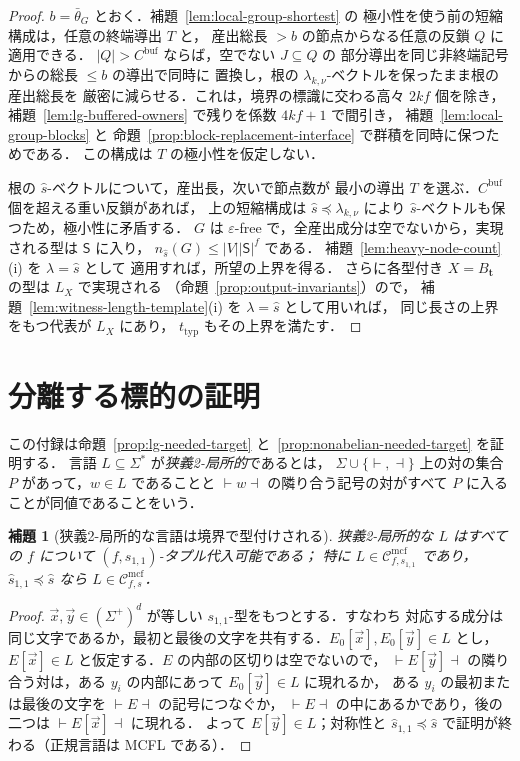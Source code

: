 \documentclass[11pt,a4paper]{ltjsarticle}
\numberwithin{equation}{section}
\theoremstyle{plain}
\newtheorem{lemma}[theorem]{補題}
\theoremstyle{definition}
\theoremstyle{remark}
\newcommand{\Cmcf}[2]{\mathcal{C}^{\mathrm{mcf}}_{#1,#2}}
\newcommand{\tuple}[1]{\vec{#1}}
\newcommand{\eps}{\varepsilon}
\theoremstyle{plain}
\begin{document}
\begin{proof}
$b=\bar\theta_G$ とおく．補題~\ref{lem:local-group-shortest} の
極小性を使う前の短縮構成は，任意の終端導出 $T$ と，
産出総長 $>b$ の節点からなる任意の反鎖 $Q$ に適用できる．
$|Q|>C^{\mathrm{buf}}$ ならば，空でない $J\subseteq Q$ の
部分導出を同じ非終端記号からの総長 $\le b$ の導出で同時に
置換し，根の $\lambda_{k,\nu}$-ベクトルを保ったまま根の産出総長を
厳密に減らせる．これは，境界の標識に交わる高々 $2kf$ 個を除き，
補題~\ref{lem:lg-buffered-owners} で残りを係数 $4kf+1$ で間引き，
補題~\ref{lem:local-group-blocks} と
命題~\ref{prop:block-replacement-interface} で群積を同時に保つためである．
この構成は $T$ の極小性を仮定しない．

根の $\widehat s$-ベクトルについて，産出長，次いで節点数が
最小の導出 $T$ を選ぶ．$C^{\mathrm{buf}}$ 個を超える重い反鎖があれば，
上の短縮構成は $\widehat s\preceq\lambda_{k,\nu}$ により
$\widehat s$-ベクトルも保つため，極小性に矛盾する．
$G$ は $\eps$-free で，全産出成分は空でないから，実現される型は
$\mathsf S$ に入り，
$n_{\widehat s}(G)\le|V||\mathsf S|^f$ である．
補題~\ref{lem:heavy-node-count}(i) を $\lambda=\widehat s$ として
適用すれば，所望の上界を得る．
さらに各型付き $X=B_{\mathbf t}$ の型は $L_X$ で実現される
（命題~\ref{prop:output-invariants}）ので，
補題~\ref{lem:witness-length-template}(i) を
$\lambda=\widehat s$ として用いれば，
同じ長さの上界をもつ代表が $L_X$ にあり，
$t_{\mathrm{typ}}$ もその上界を満たす．
\end{proof}

\section{分離する標的の証明}
\label{app:separating-targets}

この付録は命題~\ref{prop:lg-needed-target} と~\ref{prop:nonabelian-needed-target} を証明する．
言語 $L\subseteq\Sigma^*$ が\emph{狭義2-局所的}であるとは，
$\Sigma\cup\{\vdash,\dashv\}$ 上の対の集合 $P$ があって，$w\in L$ であることと
$\vdash w\dashv$ の隣り合う記号の対がすべて $P$ に入ることが同値であることをいう．

\begin{lemma}[狭義2-局所的な言語は境界で型付けされる]
\label{lem:sl2-boundary-control}
狭義2-局所的な $L$ はすべての $f$ について $(f,s_{1,1})$-タプル代入可能である；
特に $L\in\Cmcf{f}{s_{1,1}}$ であり，$\widehat s_{1,1}\preceq\widehat s$ なら $L\in\Cmcf{f}{s}$．
\end{lemma}

\begin{proof}
$\tuple x,\tuple y\in(\Sigma^+)^d$ が等しい $s_{1,1}$-型をもつとする．すなわち
対応する成分は同じ文字であるか，最初と最後の文字を共有する．$E_0[\tuple x],E_0[\tuple y]\in L$ とし，
$E[\tuple x]\in L$ と仮定する．$E$ の内部の区切りは空でないので，
$\vdash E[\tuple y]\dashv$ の隣り合う対は，ある $y_i$ の内部にあって $E_0[\tuple y]\in L$ に現れるか，
ある $y_i$ の最初または最後の文字を $\vdash E\dashv$ の記号につなぐか，
$\vdash E\dashv$ の中にあるかであり，後の二つは $\vdash E[\tuple x]\dashv$ に現れる．
よって $E[\tuple y]\in L$；対称性と $\widehat s_{1,1}\preceq\widehat s$ で証明が終わる（正規言語は MCFL である）．
\end{proof}
\end{document}
